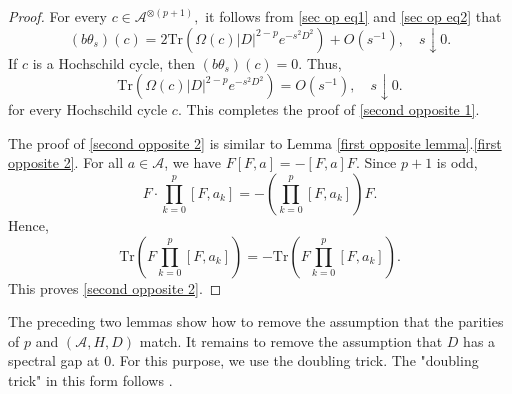 \begin{proof}
        For every $c\in\mathcal{A}^{\otimes (p+1)},$ it follows from \eqref{sec op eq1} and \eqref{sec op eq2} that
        \begin{equation*}
            (b\theta_s)(c) = 2\mathrm{Tr}(\Omega(c)|D|^{2-p}e^{-s^2D^2}) + O(s^{-1}),\quad s\downarrow0.
        \end{equation*}
        If $c$ is a Hochschild cycle, then $(b\theta_s)(c)=0.$ Thus,
        \begin{equation*}
            \mathrm{Tr}(\Omega(c)|D|^{2-p}e^{-s^2D^2}) = O(s^{-1}),\quad s\downarrow0.
        \end{equation*}
        for every Hochschild cycle $c.$ 
        This completes the proof of \eqref{second opposite 1}.

        The proof of \eqref{second opposite 2} is similar to Lemma \ref{first opposite lemma}.\eqref{first opposite 2}. 
        For all $a \in \mathcal{A}$, we have $F[F,a]=-[F,a]F.$ Since $p+1$ is odd,
        \begin{equation*}
            F\cdot \prod_{k=0}^p[F,a_k]=-\left(\prod_{k=0}^p[F,a_k]\right) F.
        \end{equation*}
        Hence,
        \begin{equation*}
            \mathrm{Tr}(F\prod_{k=0}^p[F,a_k])=-\mathrm{Tr}(F\prod_{k=0}^p[F,a_k]).
        \end{equation*}
        This proves \eqref{second opposite 2}.
    \end{proof}
    
    
    The preceding two lemmas show how to remove the assumption that the parities of $p$ and $(\mathcal{A},H,D)$ match. It remains to remove the assumption that $D$ has a spectral gap at $0.$ For this purpose, we use the doubling trick.
    The "doubling trick" in this form follows \cite[Definition 6]{CPRS1}.
    
